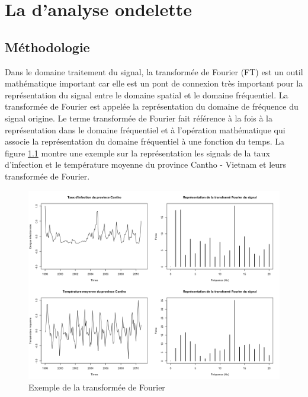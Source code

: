 
\chapter{La \mt d'analyse ondelette}
\label{chap4}

\section {Méthodologie}
Dans le domaine traitement du signal, la transformée de Fourier (FT) est un outil mathématique important car elle est un pont de connexion très important pour la représentation du signal entre le domaine spatial et le domaine fréquentiel. La transformée de Fourier est appelée la représentation du domaine de fréquence du signal origine. Le terme transformée de Fourier fait référence à la fois à la représentation dans le domaine fréquentiel et à l'opération mathématique qui associe la représentation du domaine fréquentiel à une fonction du temps. La figure \ref{Pic4_1} montre une exemple sur la représentation les signals de la taux d'infection et le température moyenne du province Cantho - Vietnam et leurs transformée de Fourier. 

\begin{figure}[h]
\includegraphics[width = \linewidth]{../figures/chap4/Pic4_1.png}
\caption{Exemple de la transformée de Fourier}
\label{Pic4_1}	
\end{figure}

